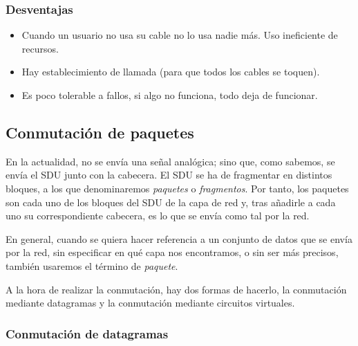 \subsubsection{Desventajas}
\begin{itemize}
    \item Cuando un usuario no usa su cable no lo usa nadie más. Uso ineficiente de recursos.
    \item Hay establecimiento de llamada (para que todos los cables se toquen).
    \item Es poco tolerable a fallos, si algo no funciona, todo deja de funcionar.
\end{itemize}

\subsection{Conmutación de paquetes}
En la actualidad, no se envía una señal analógica; sino que, como sabemos, se envía el \acrshort{SDU} junto con la cabecera. El \acrshort{SDU} se ha de fragmentar en distintos bloques, a los que denominaremos \emph{paquetes} o \emph{fragmentos}. Por tanto, los paquetes son cada uno de los bloques del \acrshort{SDU} de la capa de red y, tras añadirle a cada uno su correspondiente cabecera, es lo que se envía como tal por la red.
\begin{observacion}
    En general, cuando se quiera hacer referencia a un conjunto de datos que se envía por la red, sin especificar en qué capa nos encontramos, o sin ser más precisos, también usaremos el término de \emph{paquete}.
\end{observacion}

A la hora de realizar la conmutación, hay dos formas de hacerlo, la conmutación mediante datagramas y la conmutación mediante circuitos virtuales.

\subsubsection{Conmutación de datagramas}\label{sec:conmutacion_de_datagramas}

